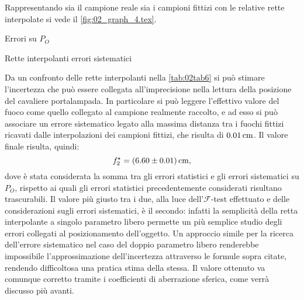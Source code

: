 Rappresentando sia il campione reale sia i campioni fittizi con le relative rette interpolate si vede il 
\autoref{fig:02_graph_4.tex}.
\begin{grafico} \centering  \caption{Errori su $P_O$} \label{fig:02_graph_4.tex} \end{grafico}
\begin{tabella}
	\centering
	
	\caption{Rette interpolanti errori sistematici}
	\label{tab:02tab6}
\end{tabella}
Da un confronto delle rette interpolanti nella \autoref{tab:02tab6} si può stimare l'incertezza che
 può essere collegata all'imprecisione nella lettura della
 posizione del cavaliere portalampada. In particolare si può leggere l'effettivo valore del fuoco come quello collegato al
 campione realmente raccolto, e ad esso si può associare un errore sistematico legato alla massima distanza tra i fuochi fittizi
 ricavati dalle interpolazioni dei campioni fittizi, che risulta di $0.01\,\mathrm{cm}$. Il valore finale risulta, quindi:
 \[f^{\star}_2 = (6.60 \pm 0.01) \,\mathrm{cm},\]
 dove è stata considerata la somma tra gli errori statistici e gli errori sistematici su $P_O$, rispetto ai quali gli
 errori statistici precedentemente considerati risultano trascurabili.
 Il valore più giusto tra i due, alla luce dell'$\mathcal{F}$-test effettuato e delle considerazioni sugli errori sistematici, è il secondo:
 infatti la semplicità della retta interpolante a singolo parametro libero permette un più semplice studio degli errori collegati
 al posizionamento dell'oggetto. Un approccio simile per la ricerca dell'errore sistematico nel caso del doppio parametro libero
 renderebbe impossibile l'approssimazione dell'incertezza attraverso le formule sopra citate, rendendo difficoltosa una pratica stima
 della stessa. Il valore ottenuto va comunque corretto tramite i coefficienti di aberrazione sferica, come verrà discusso più avanti.
